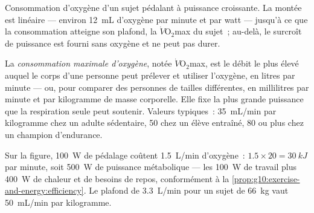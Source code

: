 \begin{omfigure}

{\small Consommation d'oxygène d'un sujet pédalant à puissance
croissante. La montée est linéaire --- environ \qty{12}{mL} d'oxygène
par minute et par watt --- jusqu'à ce que la consommation atteigne son
plafond, la $\dot V\!\mathrm{O_2}$max du sujet~; au-delà, le surcroît
de puissance est fourni sans oxygène et ne peut pas durer.}
\end{omfigure}

\begin{definition}\label{def:g10:exercise-and-energy:vo2max}
La \emph{consommation maximale d'oxygène},
notée $\dot V\!\mathrm{O_2}$max, est le débit le plus élevé auquel le
corps d'une personne peut prélever et utiliser l'oxygène, en litres par
minute --- ou, pour comparer des personnes de tailles différentes, en
millilitres par minute et par kilogramme de masse corporelle. Elle fixe
la plus grande puissance que la respiration seule peut soutenir.
Valeurs typiques~: \qty{35}{mL/min} par kilogramme chez un adulte
sédentaire, \num{50} chez un élève entraîné, \num{80} ou plus chez un
champion d'endurance.
\end{definition}

\begin{example}\label{ex:g10:exercise-and-energy:reading}
Sur la figure, \qty{100}{W} de pédalage coûtent \qty{1.5}{L/min}
d'oxygène~: $1.5 \times 20 = \qty{30}{kJ}$ par minute, soit
\qty{500}{W} de puissance métabolique --- les \qty{100}{W} de travail
plus \qty{400}{W} de chaleur et de besoins de repos, conformément à la
\cref{prop:g10:exercise-and-energy:efficiency}. Le plafond de
\qty{3.3}{L/min} pour un sujet de \qty{66}{kg} vaut \qty{50}{mL/min}
par kilogramme.
\end{example}

